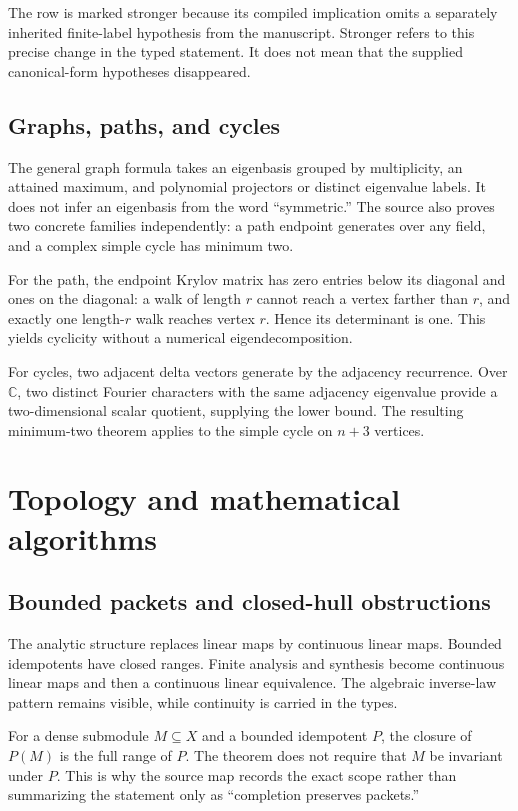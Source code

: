 \documentclass[11pt,a4paper]{article}
\begin{document}
The row is marked stronger because its compiled implication omits a separately inherited finite-label hypothesis from the manuscript. Stronger refers to this precise change in the typed statement. It does not mean that the supplied canonical-form hypotheses disappeared.

\subsection{Graphs, paths, and cycles}

The general graph formula takes an eigenbasis grouped by multiplicity, an attained maximum, and polynomial projectors or distinct eigenvalue labels. It does not infer an eigenbasis from the word ``symmetric.'' The source also proves two concrete families independently: a path endpoint generates over any field, and a complex simple cycle has minimum two.

For the path, the endpoint Krylov matrix has zero entries below its diagonal and ones on the diagonal: a walk of length $r$ cannot reach a vertex farther than $r$, and exactly one length-$r$ walk reaches vertex $r$. Hence its determinant is one. This yields cyclicity without a numerical eigendecomposition.

For cycles, two adjacent delta vectors generate by the adjacency recurrence. Over $\mathbb C$, two distinct Fourier characters with the same adjacency eigenvalue provide a two-dimensional scalar quotient, supplying the lower bound. The resulting minimum-two theorem applies to the simple cycle on $n+3$ vertices.

\section{Topology and mathematical algorithms}

\subsection{Bounded packets and closed-hull obstructions}

The analytic structure replaces linear maps by continuous linear maps. Bounded idempotents have closed ranges. Finite analysis and synthesis become continuous linear maps and then a continuous linear equivalence. The algebraic inverse-law pattern remains visible, while continuity is carried in the types.

For a dense submodule $M\subseteq X$ and a bounded idempotent $P$, the closure of $P(M)$ is the full range of $P$. The theorem does not require that $M$ be invariant under $P$. This is why the source map records the exact scope rather than summarizing the statement only as ``completion preserves packets.''
\end{document}
